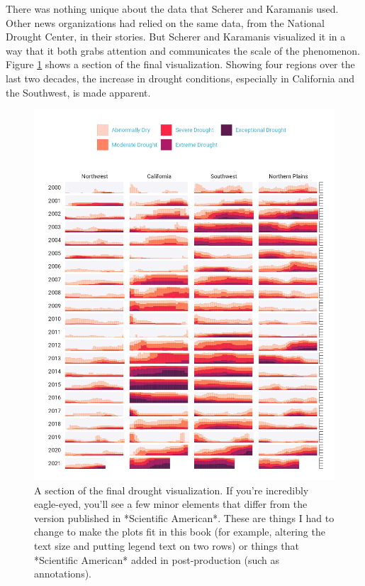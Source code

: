 \documentclass[
]{book}
\begin{document}
There was nothing unique about the data that Scherer and Karamanis used. Other news organizations had relied on the same data, from the National Drought Center, in their stories. But Scherer and Karamanis visualized it in a way that it both grabs attention and communicates the scale of the phenomenon. Figure \ref{fig:final-viz} shows a section of the final visualization. Showing four regions over the last two decades, the increase in drought conditions, especially in California and the Southwest, is made apparent.

\begin{figure}
\includegraphics[width=1\linewidth]{data-viz_files/figure-latex/final-viz-1} \caption{A section of the final drought visualization. If you’re incredibly eagle-eyed, you’ll see a few minor elements that differ from the version published in *Scientific American*. These are things I had to change to make the plots fit in this book (for example, altering the text size and putting legend text on two rows) or things that *Scientific American* added in post-production (such as annotations).}\label{fig:final-viz}
\end{figure}
\end{document}
